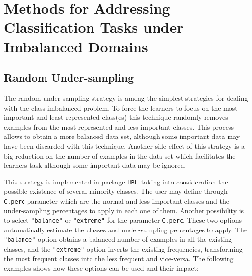 \documentclass[10pt,a4paper]{article}\usepackage[]{graphicx}\usepackage[]{color}
\newcommand{\UBL}{package \texttt{UBL}\ }
\begin{document}
\section{Methods for Addressing Classification Tasks under Imbalanced Domains}


\subsection{Random Under-sampling}\label{sec:RUClassif}

The random under-sampling strategy is among the simplest strategies for dealing with the class imbalanced problem. To force the learners to focus on the most important and least represented class(es) this technique randomly removes examples from the most represented and less important classes. This process allows to obtain a more balanced data set, although some important data may have been discarded with this technique. Another side effect of this strategy is a big reduction on the number of examples in the data set which facilitates the learners task although some important data may be ignored.

This strategy is implemented in \UBL taking into consideration the possible existence of several minority classes. The user may define through \texttt{C.perc} parameter which are the normal and less important classes and the under-sampling percentages to apply in each one of them. Another possibility is to select \texttt{"balance"} or \texttt{"extreme"} for the parameter \texttt{C.perc}. These two options automatically estimate the classes and under-sampling percentages to apply. The \texttt{"balance"} option obtains a balanced number of examples in all the existing classes, and the \texttt{"extreme"} option inverts the existing frequencies, transforming the most frequent classes into the less frequent and vice-versa. The following examples shows how these options can be used and their impact:
\end{document}
